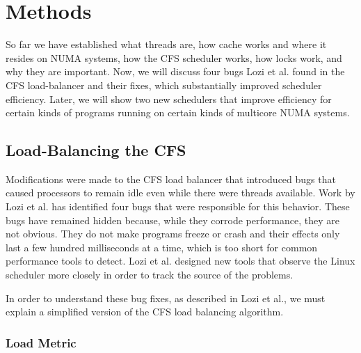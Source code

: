 \documentclass{sig-alternate}
\begin{document}

\section{Methods}
\label{sec:methods}

So far we have established what threads are, how cache works and where it resides on NUMA systems, how the CFS scheduler works, how locks work, and why they are important. Now, we will discuss four bugs Lozi et al. found in the CFS load-balancer and their fixes, which substantially improved scheduler efficiency. Later, we will show two new schedulers that improve efficiency for certain kinds of programs running on certain kinds of multicore NUMA systems.

\subsection{Load-Balancing the CFS}
\label{sec:loadbalance}

Modifications were made to the CFS load balancer that introduced bugs that caused processors to remain idle even while there were threads available. Work by Lozi et al. has identified four bugs that were responsible for this behavior. These bugs have remained hidden because, while they corrode performance, they are not obvious. They do not make programs freeze or crash and their effects only last a few hundred milliseconds at a time, which is too short for common performance tools to detect. Lozi et al. designed new tools that observe the Linux scheduler more closely in order to track the source of the problems.~\cite{Lozi:2016}

\pagebreak

In order to understand these bug fixes, as described in Lozi et al., we must explain a simplified version of the CFS load balancing algorithm.~\cite{Lozi:2016}

\subsubsection{Load Metric}
\label{sec:loadmetric}
\end{document}
